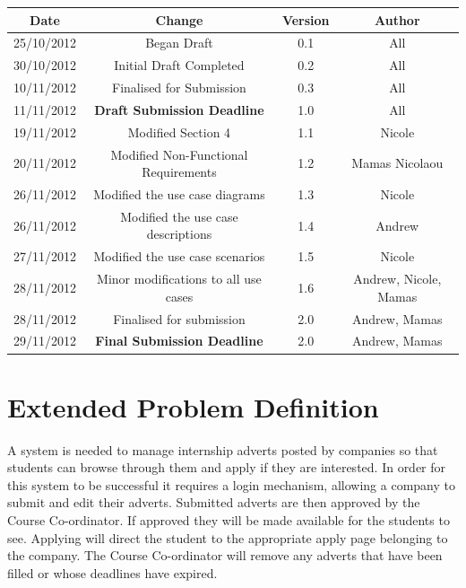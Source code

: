 \documentclass{l3deliverable}
\begin{document}
\begin{center}{
\begin{tabular}{|c|c|c|c|}
\hline \textbf{Date} &\textbf{ Change} & \textbf{Version} & \textbf{Author}\\ 
\hline 25/10/2012 & Began Draft & 0.1 & All \\ 
\hline 30/10/2012 & Initial Draft Completed & 0.2 & All \\ 
\hline 10/11/2012 & Finalised for Submission & 0.3 & All\\ 
\hline 11/11/2012 & \textbf{Draft Submission Deadline} & 1.0 & All\\ 
\hline 19/11/2012 & Modified Section 4 & 1.1 & Nicole\\
\hline 20/11/2012 & Modified Non-Functional Requirements & 1.2 & Mamas Nicolaou\\
\hline 26/11/2012 & Modified the use case diagrams & 1.3 & Nicole\\
\hline 26/11/2012 & Modified the use case descriptions & 1.4 & Andrew\\
\hline 27/11/2012 & Modified the use case scenarios & 1.5 & Nicole\\
\hline 28/11/2012 & Minor modifications to all use cases & 1.6 & Andrew, Nicole, Mamas\\
\hline 28/11/2012 & Finalised for submission & 2.0 & Andrew, Mamas\\
\hline 29/11/2012 & \textbf{Final Submission Deadline} &2.0 & Andrew, Mamas\\ 
\hline 
\end{tabular} }
\end{center}

\section{Extended Problem Definition}
A system is needed to manage internship adverts posted by companies so that students can browse
through them and apply if they are interested.
In order for this system to be successful it requires a login mechanism, allowing a company
to submit and edit their adverts. Submitted adverts are then approved by the Course
Co-ordinator. If approved they will be made available for the students to see.
Applying will direct the student to the appropriate apply page belonging to the company. 
The Course Co-ordinator will remove any adverts that have been filled or whose deadlines have expired.\\
\end{document}
